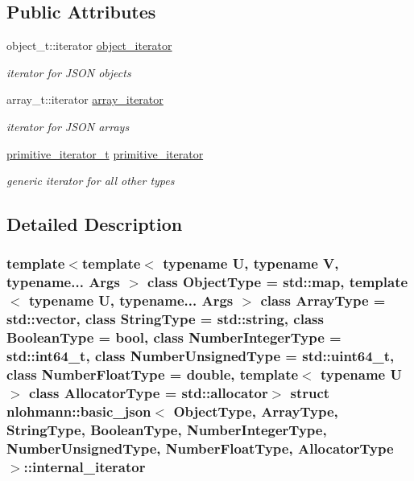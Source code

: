 \subsection*{Public Attributes}
\begin{DoxyCompactItemize}
\item 
\hypertarget{structnlohmann_1_1basic__json_1_1internal__iterator_abad8000f0a29137d6f88e8cc61ef42f9}{}\label{structnlohmann_1_1basic__json_1_1internal__iterator_abad8000f0a29137d6f88e8cc61ef42f9} 
object\+\_\+t\+::iterator \hyperlink{structnlohmann_1_1basic__json_1_1internal__iterator_abad8000f0a29137d6f88e8cc61ef42f9}{object\+\_\+iterator}
\begin{DoxyCompactList}\small\item\em iterator for J\+S\+ON objects \end{DoxyCompactList}\item 
\hypertarget{structnlohmann_1_1basic__json_1_1internal__iterator_af92f51f4d6c715e46b1e1f8dface2be9}{}\label{structnlohmann_1_1basic__json_1_1internal__iterator_af92f51f4d6c715e46b1e1f8dface2be9} 
array\+\_\+t\+::iterator \hyperlink{structnlohmann_1_1basic__json_1_1internal__iterator_af92f51f4d6c715e46b1e1f8dface2be9}{array\+\_\+iterator}
\begin{DoxyCompactList}\small\item\em iterator for J\+S\+ON arrays \end{DoxyCompactList}\item 
\hypertarget{structnlohmann_1_1basic__json_1_1internal__iterator_ac7eab7e31d99f301ba366ee274769771}{}\label{structnlohmann_1_1basic__json_1_1internal__iterator_ac7eab7e31d99f301ba366ee274769771} 
\hyperlink{classnlohmann_1_1basic__json_1_1primitive__iterator__t}{primitive\+\_\+iterator\+\_\+t} \hyperlink{structnlohmann_1_1basic__json_1_1internal__iterator_ac7eab7e31d99f301ba366ee274769771}{primitive\+\_\+iterator}
\begin{DoxyCompactList}\small\item\em generic iterator for all other types \end{DoxyCompactList}\end{DoxyCompactItemize}


\subsection{Detailed Description}
\subsubsection*{template$<$template$<$ typename U, typename V, typename... Args $>$ class Object\+Type = std\+::map, template$<$ typename U, typename... Args $>$ class Array\+Type = std\+::vector, class String\+Type = std\+::string, class Boolean\+Type = bool, class Number\+Integer\+Type = std\+::int64\+\_\+t, class Number\+Unsigned\+Type = std\+::uint64\+\_\+t, class Number\+Float\+Type = double, template$<$ typename U $>$ class Allocator\+Type = std\+::allocator$>$\newline
struct nlohmann\+::basic\+\_\+json$<$ Object\+Type, Array\+Type, String\+Type, Boolean\+Type, Number\+Integer\+Type, Number\+Unsigned\+Type, Number\+Float\+Type, Allocator\+Type $>$\+::internal\+\_\+iterator}

